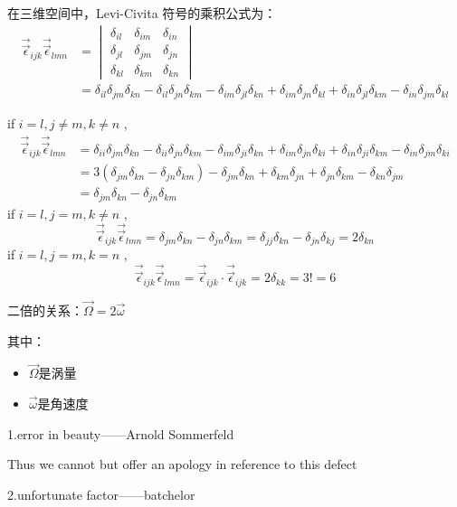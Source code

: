 \begin{lemma}
    在三维空间中，Levi-Civita 符号的乘积公式为：
\begin{align*}
    \vec{\vec{\epsilon}}_{ijk}\vec{\vec{\epsilon}}_{lmn} &= 
    \begin{vmatrix}
    \delta_{il} & \delta_{im} & \delta_{in} \\
    \delta_{jl} & \delta_{jm} & \delta_{jn} \\
    \delta_{kl} & \delta_{km} & \delta_{kn}
    \end{vmatrix}\\
    &=\delta_{il}\delta_{jm}\delta_{kn} - \delta_{il}\delta_{jn}\delta_{km} - \delta_{im}\delta_{jl}\delta_{kn} 
    + \delta_{im}\delta_{jn}\delta_{kl} + \delta_{in}\delta_{jl}\delta_{km} - \delta_{in}\delta_{jm}\delta_{kl}     
\end{align*}
\end{lemma}
\begin{corollary}

    if $i=l,j\neq m,k\neq n$ ,
    \begin{align*}
        \vec{\vec{\epsilon}}_{ijk}\vec{\vec{\epsilon}}_{lmn}
        &=\delta_{ii}\delta_{jm}\delta_{kn} - \delta_{ii}\delta_{jn}\delta_{km} - \delta_{im}\delta_{ji}\delta_{kn} 
        + \delta_{im}\delta_{jn}\delta_{ki} + \delta_{in}\delta_{ji}\delta_{km} - \delta_{in}\delta_{jm}\delta_{ki}
        \\&=3\left(\delta_{jm}\delta_{kn} - \delta_{jn}\delta_{km}\right)-\delta_{jm}\delta_{kn}+\delta_{km}\delta_{jn}
        +\delta_{jn}\delta_{km}-\delta_{kn}\delta_{jm}
        \\&=\delta_{jm}\delta_{kn} - \delta_{jn}\delta_{km}
    \end{align*}
    if $i=l,j=m,k\neq n$ ,
    \[
        \vec{\vec{\epsilon}}_{ijk}\vec{\vec{\epsilon}}_{lmn}
        =\delta_{jm}\delta_{kn} - \delta_{jn}\delta_{km}
        =\delta_{jj}\delta_{kn} - \delta_{jn}\delta_{kj}
        =2\delta_{kn}
    \]
    if $i=l,j=m,k=n$ ,
    \[
        \vec{\vec{\epsilon}}_{ijk}\vec{\vec{\epsilon}}_{lmn}
        =\vec{\vec{\epsilon}}_{ijk}\cdot\vec{\vec{\epsilon}}_{ijk}
        =2\delta_{kk}=3!=6
    \]
\end{corollary}
\begin{example}
    二倍的关系：$\vec{\Omega}=2\vec{\omega}$
\begin{flushleft}
    其中：
    \begin{itemize}
        \item $\vec{\Omega}$是涡量
        \item $\vec{\omega}$是角速度
    \end{itemize}
\end{flushleft}

1.error in beauty——Arnold Sommerfeld

Thus we cannot but offer an apology in reference to this defect

2.unfortunate factor——batchelor

\end{example}
